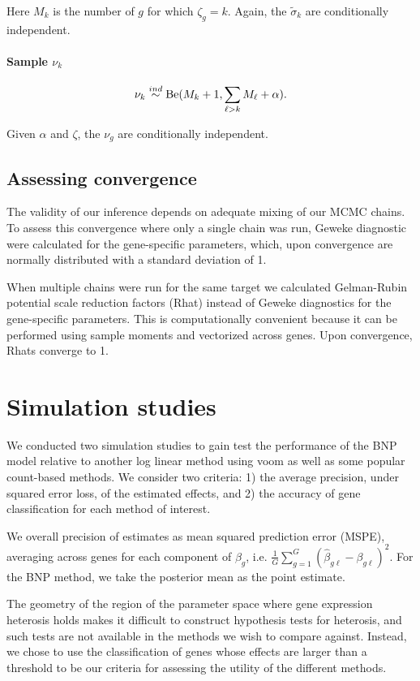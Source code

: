     Here $M_k$ is the number of $g$ for which $\zeta_g = k$. Again, the $\tilde{\sigma}_k$ are conditionally independent.

\paragraph{Sample $\nu_k$}
\begin{equation*}
\nu_k \stackrel{ind}{\sim} \operatorname{Be}(M_k + 1, \sum_{\ell>k}M_\ell + \alpha).
\end{equation*}

Given $\alpha$ and $\zeta$, the $\nu_g$ are conditionally independent.

\subsection{Assessing convergence}
The validity of our inference depends on adequate mixing of our MCMC chains. To assess this convergence where only a single chain was run, Geweke diagnostic were calculated for the gene-specific parameters, which, upon convergence are normally distributed with a standard deviation of 1.

When multiple chains were run for the same target we calculated Gelman-Rubin potential scale reduction factors (Rhat) instead of Geweke diagnostics for the gene-specific parameters. This is computationally convenient because it can be performed using sample moments and vectorized across genes. Upon convergence, Rhats converge to 1. 

\section{Simulation studies}
We conducted two simulation studies to gain test the performance of the BNP model relative to another log linear method using voom as well as some popular count-based methods. We consider two criteria: 1) the average precision, under squared error loss, of the estimated effects, and 2) the accuracy of gene classification for each method of interest.

We overall precision of estimates as mean squared prediction error (MSPE), averaging across genes for each component of $\beta_g$, i.e. $\frac{1}{G}\sum_{g=1}^G (\hat{\beta}_{g\ell}-\beta_{g\ell})^2$. For the BNP method, we take the posterior mean as the point estimate.

The geometry of the region of the parameter space where gene expression heterosis holds makes it difficult to construct hypothesis tests for heterosis, and such tests are not available in the methods we wish to compare against. Instead, we chose to use the classification of genes whose effects are larger than a threshold to be our criteria for assessing the utility of the different methods.

